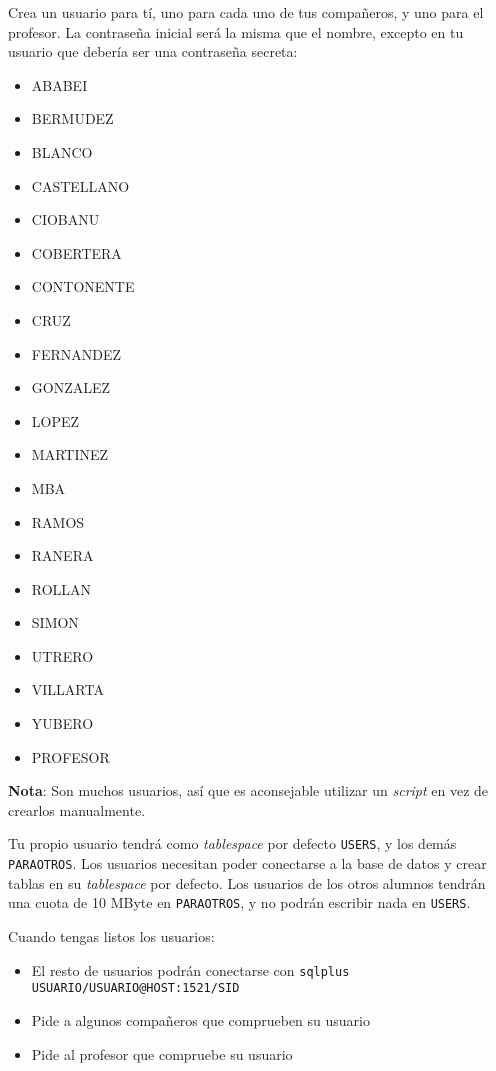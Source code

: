 \begin{homeworkProblem}

  Crea un usuario para tí, uno para cada uno de tus compañeros, y uno para el profesor. La contraseña inicial será la misma que el nombre, excepto en tu usuario que debería ser una contraseña secreta:
  \begin{multicols}{3}
    \begin{itemize}
    \item ABABEI    
    \item BERMUDEZ  
    \item BLANCO          
    \item CASTELLANO
    \item CIOBANU   
    \item COBERTERA       
    \item CONTONENTE
    \item CRUZ      
    \item FERNANDEZ  
    \item GONZALEZ  
    \item LOPEZ     
    \item MARTINEZ  
    \item MBA       
    \item RAMOS     
    \item RANERA    
    \item ROLLAN    
    \item SIMON     
    \item UTRERO    
    \item VILLARTA  
    \item YUBERO    
    \item PROFESOR
    \end{itemize}
  \end{multicols}
  {\small \textbf{Nota}: Son muchos usuarios, así que es aconsejable utilizar un \textit{script} en vez de crearlos manualmente.}

  Tu propio usuario tendrá como \textit{tablespace} por defecto \texttt{USERS}, y los demás \texttt{PARAOTROS}. Los usuarios necesitan poder conectarse a la base de datos y crear tablas en su \textit{tablespace} por defecto. Los usuarios de los otros alumnos tendrán una cuota de 10 MByte en \texttt{PARAOTROS}, y no podrán escribir nada en \texttt{USERS}.
  
  Cuando tengas listos los usuarios:
  \begin{itemize}
    \item El resto de usuarios podrán conectarse con \texttt{sqlplus USUARIO/USUARIO@HOST:1521/SID}
    \item Pide a algunos compañeros que comprueben su usuario
    \item Pide al profesor que compruebe su usuario
  \end{itemize}
\end{homeworkProblem}


